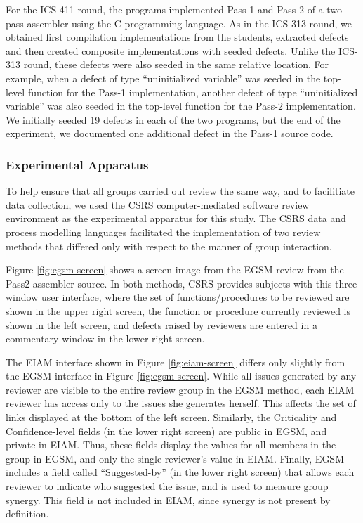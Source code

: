 For the ICS-411 round, the programs implemented Pass-1 and Pass-2 of a
two-pass assembler using the C programming language. As in the ICS-313
round, we obtained first compilation implementations from the students,
extracted defects and then created composite implementations with seeded
defects.  Unlike the ICS-313 round, these defects were also seeded in the
same relative location.  For example, when a defect of type ``uninitialized
variable'' was seeded in the top-level function for the Pass-1
implementation, another defect of type ``uninitialized variable'' was also
seeded in the top-level function for the Pass-2 implementation.  We
initially seeded 19 defects in each of the two programs, but the end of the
experiment, we documented one additional defect in the Pass-1 source code.



\subsubsection{Experimental Apparatus}

To help ensure that all groups carried out review the same way, and to 
facilitiate data collection, we used the CSRS computer-mediated software
review environment as the experimental apparatus for this study.  The
CSRS data and process modelling languages facilitated the implementation of
two review methods that differed only with respect to the manner of 
group interaction.

Figure \ref{fig:egsm-screen} shows a screen image from the EGSM review from the
Pass2 assembler source.  In both methods, CSRS provides subjects with this
three window user interface, where the set of functions/procedures to be
reviewed are shown in the upper right screen, the function or procedure
currently reviewed is shown in the left screen, and defects raised by
reviewers are entered in a commentary window in the lower right screen.


\begin{figure*}[htb]
{\centerline {}}
 \caption{An EGSM screen image from the ICS-411 round.}
 \label{fig:egsm-screen}
\end{figure*}


The EIAM interface shown in Figure \ref{fig:eiam-screen} differs only slightly
from the EGSM interface in Figure \ref{fig:egsm-screen}.  While all issues
generated by any reviewer are visible to the entire review group
in the EGSM method, each EIAM reviewer has access only to the issues she
generates herself. This affects the set of
links displayed at the bottom of the left screen. Similarly, the
Criticality and Confidence-level fields (in the lower right screen) are
public in EGSM, and private in EIAM. Thus, these fields display the values
for all members in the group in EGSM, and only the single reviewer's value
in EIAM.  Finally, EGSM includes a field called ``Suggested-by'' (in the
lower right screen) that allows each reviewer to indicate who suggested the
issue, and is used to measure group synergy. This field is not included in
EIAM, since synergy is not present by definition.


